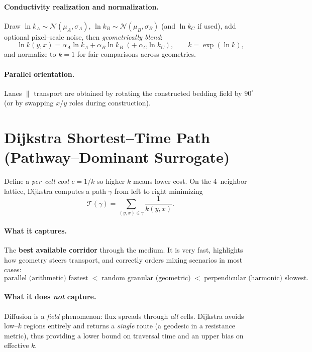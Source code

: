 \documentclass[11pt,a4paper]{article}
\begin{document}
\paragraph{Conductivity realization and normalization.} Draw $\ln k_A\!\sim\!\mathcal N(\mu_A,\sigma_A)$, $\ln k_B\!\sim\!\mathcal N(\mu_B,\sigma_B)$ (and $\ln k_C$ if used), add optional pixel--scale noise, then \emph{geometrically blend}:
\[
    \ln k(y,x)=\alpha_A \ln k_A + \alpha_B \ln k_B \;(+\;\alpha_C \ln k_C), \qquad k=\exp(\ln k),
\]
and normalize to $\overline{k}=1$ for fair comparisons across geometries.

\paragraph{Parallel orientation.} Lanes $\parallel$ transport are obtained by rotating the constructed bedding field by $90^\circ$ (or by swapping $x$/$y$ roles during construction).

\bigskip

\section{Dijkstra Shortest--Time Path (Pathway--Dominant Surrogate)}
Define a \emph{per--cell cost} $c=1/k$ so higher $k$ means lower cost. On the 4--neighbor lattice, Dijkstra computes a path $\gamma$ from left to right minimizing
\[
    \mathcal{T}(\gamma)=\sum_{(y,x)\in\gamma} \frac{1}{k(y,x)}.
\]
\paragraph{What it captures.} The \textbf{best available corridor} through the medium. It is very fast, highlights how geometry steers transport, and correctly orders mixing scenarios in most cases:
\[
    \text{parallel (arithmetic) fastest} \;<\; \text{random granular (geometric)} \;<\; \text{perpendicular (harmonic) slowest}.
\]
\paragraph{What it does \emph{not} capture.} Diffusion is a \emph{field} phenomenon: flux spreads through \emph{all} cells. Dijkstra avoids low--$k$ regions entirely and returns a \emph{single} route (a geodesic in a resistance metric), thus providing a lower bound on traversal time and an upper bias on effective $k$.
\end{document}
